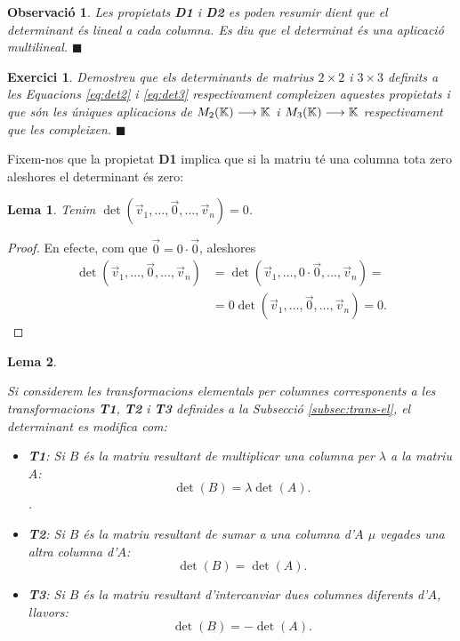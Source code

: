 \documentclass[
  11pt,
]{book}
\numberwithin{dummy}{section}
\theoremstyle{maincolornumbox}
\newtheorem{exerciseT}{Exercici}[chapter]
\newtheorem{remarkT}{Observació}[chapter]
\theoremstyle{blacknumex}
\theoremstyle{blacknumbox}
\theoremstyle{maincolornum}
\newtheorem{lemmaT}{Lema}[chapter]
\newenvironment{lemma}{\begin{pBox}\begin{lemmaT}}{\end{lemmaT}\end{pBox}}
\newenvironment{exercise}{\begin{eBox}\begin{exerciseT}}{\hfill{\color{maincolor}\tiny\ensuremath{\blacksquare}}\end{exerciseT}\end{eBox}}
\newenvironment{remark}{\begin{remarkT}}{\hfill{\tiny\ensuremath{\blacksquare}}\end{remarkT}}
\newlength\esp
\begin{document}
\begin{remark}
Les propietats \textbf{D1} i \textbf{D2} es poden resumir dient que el determinant
és lineal a cada columna. Es diu que el determinat és una aplicació
\emph{multilineal}.
\end{remark}

\begin{exercise}
Demostreu que els determinants de matrius \(2\times 2\) i \(3\times 3\)
definits a les Equacions \eqref{eq:det2} i \eqref{eq:det3} respectivament compleixen aquestes propietats i que
són les úniques aplicacions de \(M_2(\mathbb{K}) \longrightarrow \mathbb{K}\) i \(M_3(\mathbb{K})\longrightarrow\mathbb{K}\)
respectivament que les compleixen.
\end{exercise}

Fixem-nos que la propietat \textbf{D1} implica que si la matriu té una
columna tota zero aleshores el determinant és zero:

\begin{lemma}
\protect\hypertarget{lem:det0}{}\label{lem:det0}Tenim
\(\det(\vec v_1, \dots, \vec 0, \dots,\vec v_n)=0\).
\end{lemma}

\begin{proof}
En efecte, com que \(\vec 0=0 \cdot \vec 0\), aleshores
\begin{align*}
\det(\vec v_1, \dots, \vec 0, \dots,\vec v_n) & = \det(\vec v_1, \dots, 0\cdot\vec 0, \dots,\vec v_n) = \\
& = 0 \det(\vec v_1, \dots, \vec 0, \dots,\vec v_n)=0.
\end{align*}
\end{proof}

\begin{lemma}
\protect\hypertarget{lem:det-i-trans-elem}{}\label{lem:det-i-trans-elem}

Si considerem
les transformacions elementals per columnes corresponents a les
transformacions \textbf{T1}, \textbf{T2} i \textbf{T3} definides a la Subsecció
\ref{subsec:trans-el}, el determinant es modifica com:

\begin{itemize}
\item
  \textbf{T1}: Si \(B\) és la matriu resultant de multiplicar una columna per
  \(\lambda\) a la matriu \(A\): \[\det(B)=\lambda \det(A).\].
\item
  \textbf{T2}: Si \(B\) és la matriu resultant de sumar a una columna d'\(A\)
  \(\mu\) vegades una altra columna d'\(A\): \[\det(B)=\det(A).\]
\item
  \textbf{T3}: Si \(B\) és la matriu resultant d'intercanviar dues columnes
  diferents d'\(A\), llavors: \[\det(B)=-\det(A).\]
\end{itemize}

\end{lemma}
\end{document}
